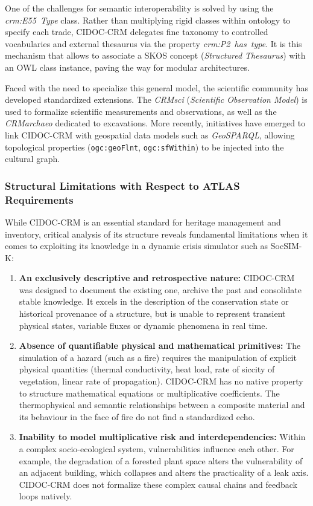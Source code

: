 \documentclass{article}
\begin{document}
One of the challenges for semantic interoperability is solved by using the \textit{crm:E55\ Type} class. Rather than multiplying rigid classes within ontology to specify each trade, CIDOC-CRM delegates fine taxonomy to controlled vocabularies and external thesaurus via the property \textit{crm:P2\ has\ type}. It is this mechanism that allows to associate a SKOS concept (\textit{Structured Thesaurus}) with an OWL class instance, paving the way for modular architectures.

Faced with the need to specialize this general model, the scientific community has developed standardized extensions. The \textit{CRMsci} (\textit{Scientific Observation Model}) is used to formalize scientific measurements and observations, as well as the \textit{CRMarchaeo} dedicated to excavations. More recently, initiatives have emerged to link CIDOC-CRM with geospatial data models such as \textit{GeoSPARQL}, allowing topological properties (\texttt{ogc:geoFlnt}, \texttt{ogc:sfWithin}) to be injected into the cultural graph.

\subsubsection{Structural Limitations with Respect to ATLAS Requirements}

While CIDOC-CRM is an essential standard for heritage management and inventory, critical analysis of its structure reveals fundamental limitations when it comes to exploiting its knowledge in a dynamic crisis simulator such as SocSIM-K:

\begin{enumerate}
\item \textbf {An exclusively descriptive and retrospective nature:} CIDOC-CRM was designed to document the existing one, archive the past and consolidate stable knowledge. It excels in the description of the conservation state or historical provenance of a structure, but is unable to represent transient physical states, variable fluxes or dynamic phenomena in real time.
\item \textbf{Absence of quantifiable physical and mathematical primitives:} The simulation of a hazard (such as a fire) requires the manipulation of explicit physical quantities (thermal conductivity, heat load, rate of siccity of vegetation, linear rate of propagation). CIDOC-CRM has no native property to structure mathematical equations or multiplicative coefficients. The thermophysical and semantic relationships between a composite material and its behaviour in the face of fire do not find a standardized echo.
\item \textbf{Inability to model multiplicative risk and interdependencies: } Within a complex socio-ecological system, vulnerabilities influence each other. For example, the degradation of a forested plant space alters the vulnerability of an adjacent building, which collapses and alters the practicality of a leak axis. CIDOC-CRM does not formalize these complex causal chains and feedback loops natively.
\end{enumerate}
\end{document}
